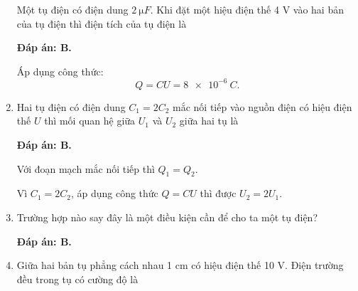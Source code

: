 \begin{enumerate}[label=\bfseries Câu \arabic*:]
	\cauhoi
	{Một tụ điện có điện dung $\SI{2}{\micro F}$. Khi đặt một hiệu điện thế 4 V vào hai bản của tụ điện thì điện tích của tụ điện là
		
	}
	\loigiai
	{	\textbf{Đáp án: B.}
		
		Áp dụng công thức:
		$$Q=CU = \SI{8e-6}{C}.$$
	}
	\item {}
	
	\cauhoi
	{Hai tụ điện có điện dung $C_1=2C_2$ mắc nối tiếp vào nguồn điện có hiệu điện thế $U$ thì mối quan hệ giữa $U_1$ và $U_2$ giữa hai tụ là
		
	}
	\loigiai
	{	\textbf{Đáp án: B.}
		
		Với đoạn mạch mắc nối tiếp thì $Q_1=Q_2$.
		
		Vì $C_1 = 2C_2$, áp dụng công thức $Q=CU$ thì được $U_2 = 2U_1$.
	}
	\item {}
	
	\cauhoi
	{Trường hợp nào say đây là một điều kiện cần để cho ta một tụ điện?
		
	}
	\loigiai
	{	\textbf{Đáp án: B.}
	
	}
	\item {}
	
	\cauhoi
	{Giữa hai bản tụ phẳng cách nhau 1 cm có hiệu điện thế 10 V. Điện trường đều trong tụ có cường độ là
		
}
\end{enumerate}
